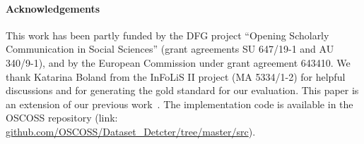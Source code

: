 \documentclass{IOS-Book-Article}
\begin{document}
\paragraph{Acknowledgements}
This work has been partly funded by the DFG project “Opening Scholarly Communication in Social Sciences” 
(grant agreements SU 647/19-1 and AU 340/9-1), and by the European Commission under grant agreement 643410. 
We thank Katarina Boland from the InFoLiS II project (MA 5334/1-2) for helpful discussions and for generating the gold standard for our evaluation. 
This paper is an extension of our previous work~\cite{ghavimi2016identifying}. The implementation code is available in the OSCOSS repository (link: \url{github.com/OSCOSS/Dataset_Detcter/tree/master/src}). 


\end{document}
